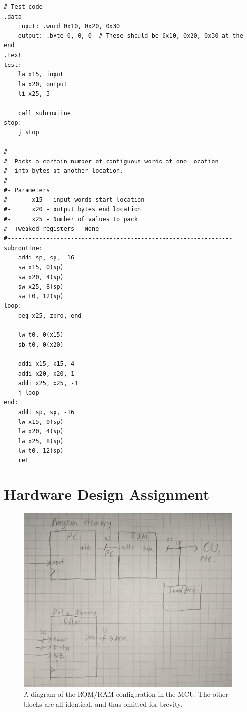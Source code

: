 \documentclass{article}
\begin{document}
\begin{verbatim}
# Test code
.data
    input: .word 0x10, 0x20, 0x30
    output: .byte 0, 0, 0  # These should be 0x10, 0x20, 0x30 at the end
.text
test:
    la x15, input
    la x20, output
    li x25, 3
    
    call subroutine
stop:
    j stop

#---------------------------------------------------------------- 
#- Packs a certain number of contiguous words at one location 
#- into bytes at another location.
#-
#- Parameters
#-      x15 - input words start location
#-      x20 - output bytes end location
#-      x25 - Number of values to pack
#- Tweaked registers - None
#----------------------------------------------------------------     
subroutine:
    addi sp, sp, -16
    sw x15, 0(sp)
    sw x20, 4(sp)
    sw x25, 8(sp)
    sw t0, 12(sp)
loop:
    beq x25, zero, end
    
    lw t0, 0(x15)
    sb t0, 0(x20)
    
    addi x15, x15, 4
    addi x20, x20, 1
    addi x25, x25, -1
    j loop
end:
    addi sp, sp, -16
    lw x15, 0(sp)
    lw x20, 4(sp)
    lw x25, 8(sp)
    lw t0, 12(sp)
    ret
\end{verbatim}

\pagebreak

\section{Hardware Design Assignment}

\begin{figure}[]
    \centering
    \includegraphics[width=\linewidth]{hwd.jpg}
    \caption{A diagram of the ROM/RAM configuration in the MCU. The other blocks are all 
    identical, and thus omitted for brevity.}
    \label{fig:hwd}
\end{figure}
\end{document}
